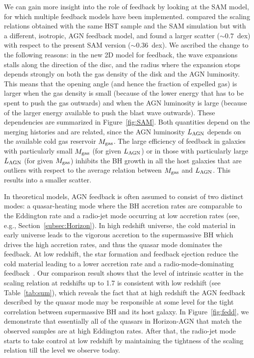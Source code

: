 \documentclass[twocolumn]{aastex631}
\begin{document}
We can gain more insight into the role of feedback by looking at the SAM model, for which multiple feedback models have been implemented. \citet{Ding2020b} compared the scaling relations obtained with the same HST sample and the SAM simulation but with a different, isotropic, AGN feedback model, and found a larger scatter ($\sim0.7$~dex) with respect to the present SAM version ($\sim0.36$~dex). We ascribed the change to the following reasons: in the new 2D model for feedback, the wave expansions stalls along the direction of the disc, and the radius where the expansion stops depends strongly on both the gas density of the disk and the AGN luminosity. 
This means that the opening angle (and hence the fraction of expelled gas) is larger when the gas density is small (because of the lower energy that has to be spent to push the gas outwards) and when the AGN luminosity is large (because of the larger energy available to push the blast wave outwards). These dependencies are summarized in Figure~\ref{fig:SAM}. 
Both quantities depend on the merging histories and are  related, since the AGN luminosity $L_{\rm AGN}$ depends on the available cold gas reservoir $M_{\rm gas}$.
The large efficiency of feedback in galaxies with particularly small $M_{\rm gas}$ (for given $L_{\rm AGN}$) or in those with particularly large $L_{\rm AGN}$
(for given $M_{\rm gas}$) inhibits the BH growth in all the host galaxies that are outliers with respect to the average relation between $M_{\rm gas}$ and $L_{\rm AGN}$. 
This results into a smaller scatter.

In theoretical models, AGN feedback is often assumed to consist of two distinct modes:
a quasar-heating mode where the BH accretion rates are comparable to the Eddington rate and a radio-jet mode occurring at low accretion rates (see, e.g., Section~\ref{subsec:Horizon}). In high redshift universe, the cold material in early universe leads to the vigorous accretion to the supermassive BH which drives the high accretion rates, and thus the quasar mode dominates the feedback. At low redshift, the star formation and feedback ejection reduce the cold material leading to a lower accretion rate and a radio-mode-dominating feedback~\citep[e.g.][]{2012MNRAS.420.2662D,2016MNRAS.460.2979V,2018MNRAS.479.4056W}. Our comparison result shows that the level of intrinsic scatter in the scaling relation at redshifts up to 1.7 is consistent with low redshift (see Table~\ref{tab:sum}), which reveals the fact that at high redshift the AGN feedback described by the quasar mode may be responsible at some level for the tight correlation between supermassive BH and its host galaxy. In Figure~\ref{fig:fedd}, we demonstrate that essentially all of the quasars in Horizon-AGN that match the observed samples are at high Eddington rates. After that, the radio-jet mode starts to take control at low redshift by maintaining the tightness of the scaling relation till the level we observe today.
\end{document}
